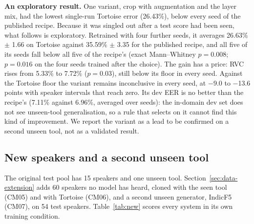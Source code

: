 \textbf{An exploratory result.} One variant, crop with augmentation and the layer
mix, had the lowest single-run Tortoise error (26.43\%), below every seed of the
published recipe. Because it was singled out after a test score had been seen, what
follows is exploratory. Retrained with four further seeds, it averages 26.63\%
$\pm$ 1.66 on Tortoise against 35.59\% $\pm$ 3.35 for the published recipe, and all
five of its seeds fall below all five of the recipe's (exact Mann--Whitney
$p = 0.008$; $p = 0.016$ on the four seeds trained after the choice). The gain has a
price: RVC rises from 5.33\% to 7.72\% ($p = 0.03$), still below its floor in every
seed. Against the Tortoise floor the variant remains inconclusive in every seed, at
$-$9.0 to $-$13.6 points with speaker intervals that reach zero. Its dev EER is no
better than the recipe's (7.11\% against 6.96\%, averaged over seeds): the in-domain
dev set does not see unseen-tool generalisation, so a rule that selects on it cannot
find this kind of improvement. We report the variant as a lead to be confirmed on a
second unseen tool, not as a validated result.

\subsection{New speakers and a second unseen tool}
\label{sec:res-new}

The original test pool has 15 speakers and one unseen tool. Section~\ref{sec:data-extension}
adds 60 speakers no model has heard, cloned with the seen tool (CM05) and with Tortoise
(CM06), and a second unseen generator, IndicF5 (CM07), on 54 test speakers.
Table~\ref{tab:new} scores every system in its own training condition.

